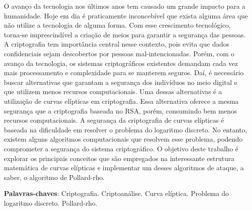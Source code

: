 \begin{resumo}
O avanço da tecnologia nos últimos anos tem causado um grande impacto para a humanidade. Hoje em dia é praticamente inconcebível que exista alguma área que não utilize a tecnologia de alguma forma. Com esse crescimento tecnológico, torna-se imprescindível a criação de meios para garantir a segurança das pessoas. A criptografia tem importância central nesse contexto, pois evita que dados confidenciais sejam descobertos por pessoas mal-intencionadas. Porém, com o avanço da tecnologia, os sistemas criptográficos existentes demandam cada vez mais processamento e complexidade para se manterem seguros. Daí, é necessário buscar alternativas que garantam a segurança dos indivíduos no meio digital e que utilizem menos recursos computacionais. Uma dessas alternativas é a utilização de curvas elípticas em criptografia. Essa alternativa oferece a mesma segurança que a criptografia baseada no RSA, porém, consumindo bem menos recursos computacionais. A segurança da criptografia de curvas elípticas é baseada na dificuldade em resolver o problema do logaritmo discreto. No entanto, existem alguns algoritmos computacionais que resolvem esse problema, podendo comprometer a segurança do sistema criptográfico. O objetivo deste trabalho é explorar os principais conceitos que são empregados na interessante estrutura matemática de curvas elípticas e implementar um desses algoritmos de ataque, a saber, o algoritmo de Pollard-rho.

\vspace{\onelineskip}
    
\noindent
\textbf{Palavras-chaves}: Criptografia. Criptoanálise. Curva elíptica. Problema do logaritmo discreto. Pollard-rho.
\end{resumo}
